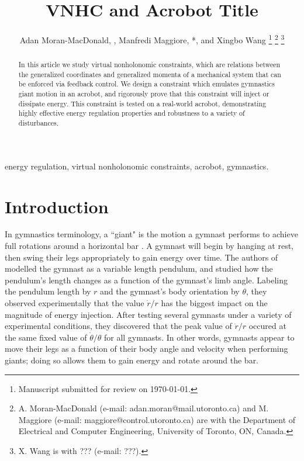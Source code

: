 \documentclass[journal,twoside,web]{ieeecolor}
\newcommand*{\Title}{VNHC and Acrobot Title}
\begin{document}
\title{\Title}
\author{Adan Moran-MacDonald, , Manfredi Maggiore,
*, and Xingbo Wang
\thanks{Manuscript submitted for review on \today.}
\thanks{A. Moran-MacDonald (e-mail: adan.moran@mail.utoronto.ca) and
M. Maggiore (e-mail: maggiore@control.utoronto.ca) are with the Department of
Electrical and Computer Engineering, University of Toronto, ON, Canada.}
\thanks{X. Wang is with ??? (e-mail: ???).}
} %

\maketitle

\begin{abstract}
    In this article we study virtual nonholonomic constraints, which are
    relations between the generalized coordinates and generalized momenta of a
    mechanical system that can be enforced via feedback control.
    We design a constraint which emulates gymnastics giant motion in an
    acrobot, and rigorously prove that this constraint will inject or dissipate
    energy.
    This constraint is tested on a real-world acrobot, demonstrating highly
    effective energy regulation properties and robustness to a variety of
    disturbances.
\end{abstract}

\begin{IEEEkeywords}
    energy regulation, virtual nonholonomic constraints, acrobot, gymnastics.
\end{IEEEkeywords}

\section{Introduction}\label{sec:introduction}

In gymnastics terminology, a ``giant" is the motion a gymnast performs to
achieve full rotations around a horizontal bar \cite{usagym_giant}. 
A gymnast will begin by hanging at rest, then swing their legs
appropriately to gain energy over time.
The authors of \cite{pendulum_length_giant_gymnastics} modelled the gymnast as a
variable length pendulum, and studied how the pendulum's length changes as a
function of the gymnast's limb angle.
Labeling the pendulum length by \(r\) and the gymnast's body orientation
by \(\theta\), they observed experimentally that the value \(\dot{r}/r\) has
the biggest impact on the magnitude of energy injection. 
After testing several gymnasts under a variety of experimental conditions, 
they discovered that the peak value of \(\dot{r}/r\) occured at the same fixed
value of \(\dot{\theta}/\theta\) for all gymnasts.
In other words, gymnasts appear to move their legs as a function of their body
angle and velocity when performing giants; 
doing so allows them to gain energy and rotate around the bar.
\end{document}
